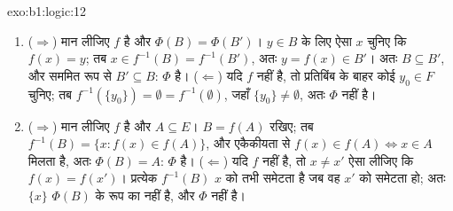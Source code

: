 \begin{solution}{exo:b1:logic:12}
\begin{enumerate}
  \item ($\Rightarrow$) मान लीजिए $f$  है और $\Phi(B) = \Phi(B')$। $y
  \in B$ के लिए ऐसा $x$ चुनिए कि $f(x) = y$; तब $x \in f^{-1}(B) =
  f^{-1}(B')$, अतः $y = f(x) \in B'$। अतः $B \subseteq B'$, और सममित रूप से
  $B' \subseteq B$: $\Phi$  है। ($\Leftarrow$) यदि $f$  नहीं है,
  तो प्रतिबिंब के बाहर कोई $y_0 \in F$ चुनिए; तब $f^{-1}(\{y_0\}) =
  \emptyset = f^{-1}(\emptyset)$, जहाँ $\{y_0\} \neq \emptyset$, अतः $\Phi$
   नहीं है।
  \item ($\Rightarrow$) मान लीजिए $f$  है और $A \subseteq E$। $B =
  f(A)$ रखिए; तब $f^{-1}(B) = \{x : f(x) \in f(A)\}$, और एकैकीयता से $f(x)
  \in f(A) \iff x \in A$ मिलता है, अतः $\Phi(B) = A$: $\Phi$  है।
  ($\Leftarrow$) यदि $f$  नहीं है, तो $x \neq x'$ ऐसा लीजिए कि $f(x) =
  f(x')$। प्रत्येक   $f^{-1}(B)$ $x$ को तभी समेटता है
  जब वह $x'$ को समेटता हो; अतः $\{x\}$ $\Phi(B)$ के रूप का नहीं है, और
  $\Phi$  नहीं है।
\end{enumerate}
\end{solution}

